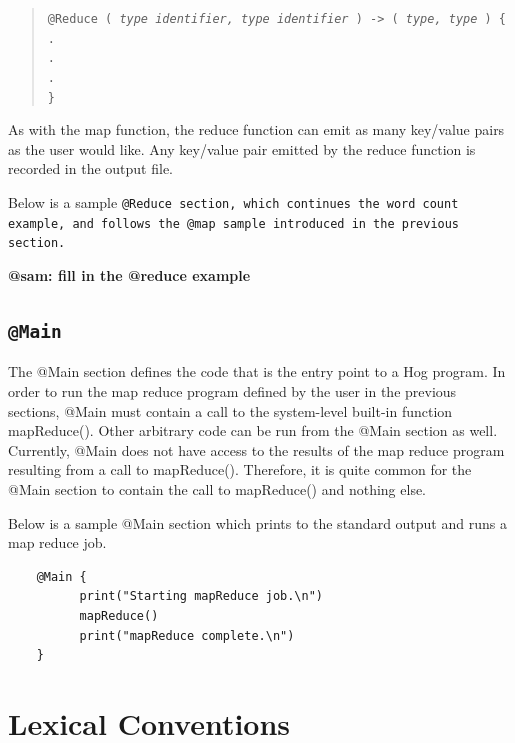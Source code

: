 \documentclass{article}
\begin{document}
\begin{quotation}
  \tt @Reduce ( \rm \emph{type identifier, type identifier} \tt ) -> ( \rm \emph{type, type} \tt ) \{ \\
  \indent \indent . \\
  \indent \indent . \\
  \indent \indent . \\
  \indent \tt \} \rm
\end{quotation}

As with the map function, the reduce function can emit as many key/value pairs as
the user would like. Any key/value pair emitted by the reduce function is recorded
in the output file.

Below is a sample \tt @Reduce \rm section, which continues the word count example,
and follows the \tt @map \rm sample introduced in the previous section.

\textbf{@sam: fill in the @reduce example}


\subsection{\tt @Main \rm} %
\label{sec:tt_main_rm}

The @Main section defines the code that is the entry point to a Hog program. In
order to run the map reduce program defined by the user in the previous sections,
@Main must contain a call to the system-level built-in function mapReduce(). Other
arbitrary code can be run from the @Main section as well. Currently, @Main does
not have access to the results of the map reduce program resulting from a call to
mapReduce(). Therefore, it is quite common for the @Main section to contain the
call to mapReduce() and nothing else.

Below is a sample @Main section which prints to the standard output and runs a map reduce job.

\begin{verbatim}
    @Main {
          print("Starting mapReduce job.\n")
          mapReduce()
          print("mapReduce complete.\n")
    }
\end{verbatim}




\section{Lexical Conventions} %
\label{sec:lexical_conventions}
\end{document}
